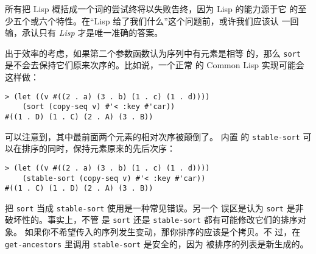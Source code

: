 \begin{notes}
  所有把 Lisp 概括成一个词的尝试终将以失败告终，因为 Lisp 的能力源于它
  的至少五个或六个特性。在“Lisp 给了我们什么”这个问题前，或许我们应该认
  一回输，承认只有 \emph{Lisp} 才是唯一准确的答案。

  出于效率的考虑，如果第二个参数函数认为序列中有元素是相等
  的，那么 \texttt{sort} 是不会去保持它们原来次序的。比如说，一个正常
  的 Common Lisp 实现可能会这样做：
\begin{verbatim}
> (let ((v #((2 . a) (3 . b) (1 . c) (1 . d))))
    (sort (copy-seq v) #'< :key #'car))
#((1 . D) (1 . C) (2 . A) (3 . B))
\end{verbatim}
  可以注意到，其中最前面两个元素的相对次序被颠倒了。 内置
  的 \texttt{stable-sort} 可以在排序的同时，保持元素原来的先后次序：
\begin{verbatim}
> (let ((v #((2 . a) (3 . b) (1 . c) (1 . d))))
    (stable-sort (copy-seq v) #'< :key #'car))
#((1 . C) (1 . D) (2 . A) (3 . B))
\end{verbatim}
  把 \texttt{sort} 当成 \texttt{stable-sort} 使用是一种常见错误。另一个
  误区是认为 \texttt{sort} 是非破坏性的。事实上，不管
  是 \texttt{sort} 还是 \texttt{stable-sort} 都有可能修改它们的排序对象。
  如果你不希望传入的序列发生变动，那你排序的应该是个拷贝。不
  过，在 \verb|get-ancestors| 里调用 \verb|stable-sort| 是安全的，因为
  被排序的列表是新生成的。
\end{notes}

